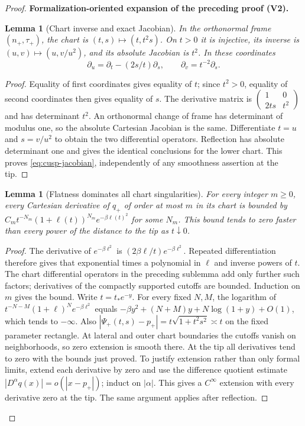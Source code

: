 \documentclass[11pt]{article}
\newtheorem{lemma}[theorem]{Lemma}
\newcommand{\formalisationparentid}{X}
\newenvironment{formalisationaddition}[1]{\par\medskip\begingroup\color{blue}\def\formalisationparentid{#1}\setcounter{formalizationsublemma}{0}\let\lemma\formalizationsublemma\let\endlemma\endformalizationsublemma
  \def\Eo{\mathcal E_h^\circ}\def\EE{\mathcal E_h}\def\phio{\phi_h^\circ}\def\phih{\phi_h}\def\Ho{H_h^{\rm atom}(v^\circ)}\def\Ha{H_h^{\rm atom}}\def\HL{H_h^{L}}\def\Dh{D_h}\def\Log{\operatorname{Log}}\def\ellh{\ell_h}\def\Gp{G_{p,h}}\def\Ast{A_{*,h}}\def\ahat{\widehat{\mathfrak a}_h}\def\ah{\mathfrak a_h}\def\rh{\widehat\rho_h}\def\deltah{\widehat\delta_h}\def\oldref##1{\textup{(##1)}}\def\interface##1{\par\noindent\textit{Analytical interface used here.} ##1\par}\def\finish{\par\noindent\textit{Conclusion of the formalization-oriented expansion.} }\par\noindent\textbf{Formalization-oriented expansion of the preceding proof (V2).}\par\smallskip
}{\par\endgroup\medskip
}
\begin{document}
\begin{proof}
\begin{formalisationaddition}{L2.9}
\begin{lemma}[Chart inverse and exact Jacobian]\label{sublemma:L2-9-chart-calculus}
In the orthonormal frame $(n_+,\tau_+)$, the chart is $(t,s)\mapsto(t,t^2s)$. On $t>0$ it is injective, its inverse is $(u,v)\mapsto(u,v/u^2)$, and its absolute Jacobian is $t^2$. In these coordinates
\[
 \partial_u=\partial_t-(2s/t)\partial_s,\qquad
 \partial_v=t^{-2}\partial_s.
\]
\end{lemma}
\begin{proof}
Equality of first coordinates gives equality of $t$; since $t^2>0$, equality of second coordinates then gives equality of $s$. The derivative matrix is
$\left(\begin{smallmatrix}1&0\\2ts&t^2\end{smallmatrix}\right)$ and has determinant $t^2$. An orthonormal change of frame has determinant of modulus one, so the absolute Cartesian Jacobian is the same. Differentiate $t=u$ and $s=v/u^2$ to obtain the two differential operators. Reflection has absolute determinant one and gives the identical conclusions for the lower chart. This proves \eqref{eq:cusp-jacobian}, independently of any smoothness assertion at the tip.
\end{proof}

\begin{lemma}[Flatness dominates all chart singularities]\label{sublemma:L2-9-flat-extension}
For every integer $m\ge0$, every Cartesian derivative of $q_+$ of order at most $m$ in its chart is bounded by
$C_m t^{-N_m}(1+\ell(t))^{N_m}e^{-\beta\ell(t)^2}$ for some $N_m$. This bound tends to zero faster than every power of the distance to the tip as $t\downarrow0$.
\end{lemma}
\begin{proof}
The derivative of $e^{-\beta\ell^2}$ is $(2\beta\ell/t)e^{-\beta\ell^2}$. Repeated differentiation therefore gives that exponential times a polynomial in $\ell$ and inverse powers of $t$. The chart differential operators in the preceding sublemma add only further such factors; derivatives of the compactly supported cutoffs are bounded. Induction on $m$ gives the bound.
Write $t=t_*e^{-y}$. For every fixed $N,M$, the logarithm of
$t^{-N-M}(1+\ell)^N e^{-\beta\ell^2}$ equals $-\beta y^2+(N+M)y+N\log(1+y)+O(1)$, which tends to $-\infty$. Also
$|\Psi_+(t,s)-p_+|=t\sqrt{1+t^2s^2}\asymp t$ on the fixed parameter rectangle.
At lateral and outer chart boundaries the cutoffs vanish on neighborhoods, so zero extension is smooth there. At the tip all derivatives tend to zero with the bounds just proved. To justify extension rather than only formal limits, extend each derivative by zero and use the difference quotient estimate $|D^\alpha q(x)|=o(|x-p_+|)$; induct on $|\alpha|$. This gives a $C^\infty$ extension with every derivative zero at the tip. The same argument applies after reflection.
\end{proof}


\end{formalisationaddition}
\end{proof}
\end{document}
